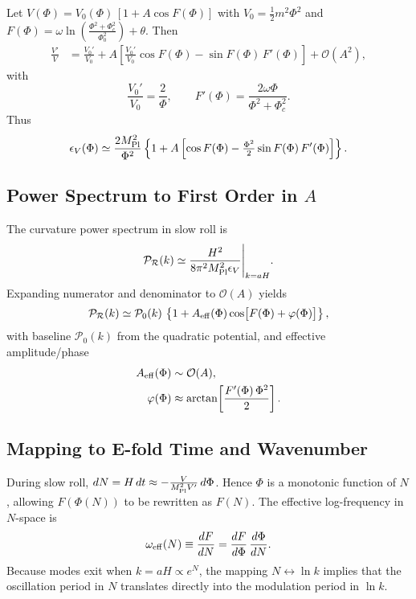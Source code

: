 \documentclass[reprint, amsmath, amssymb, aps, prd, nofootinbib]{revtex4-2}
\begin{document}
Let $V(\Phi) = V_0(\Phi)\,[1+A \cos F(\Phi)]$ with $V_0 = \tfrac{1}{2} m^2 \Phi^2$
and $F(\Phi)= \omega \ln(\tfrac{\Phi^2+\Phi_c^2}{\Phi_0^2})+\theta$.
Then
\begin{align}
\frac{V'}{V}
&= \frac{V_0'}{V_0}
+ A\left[\frac{V_0'}{V_0}\cos F(\Phi) - \sin F(\Phi)\,F'(\Phi)\right]
+ \mathcal{O}(A^2),
\end{align}
with
\begin{equation}
\frac{V_0'}{V_0} = \frac{2}{\Phi}, \qquad
F'(\Phi) = \frac{2\omega \Phi}{\Phi^2+\Phi_c^2}.
\end{equation}
Thus
\begin{equation}
\epsilon_V(\Phi) \simeq \frac{2 M_{\rm Pl}^2}{\Phi^2}
\left\{ 1 + A \left[ \cos F(\Phi) - \tfrac{\Phi^2}{2} \sin F(\Phi)\,F'(\Phi)\right] \right\}.
\end{equation}

\subsection{Power Spectrum to First Order in $A$}

The curvature power spectrum in slow roll is
\begin{equation}
\mathcal{P}_\mathcal{R}(k) \simeq \frac{H^2}{8\pi^2 M_{\rm Pl}^2 \epsilon_V}
\Bigg|_{k=aH}.
\label{eq:PR}
\end{equation}
Expanding numerator and denominator to $\mathcal{O}(A)$ yields
\begin{equation}
\mathcal{P}_\mathcal{R}(k) \simeq \mathcal{P}_0(k)\,
\left\{1 + A_{\rm eff}(\Phi)\cos\!\big[F(\Phi)+\varphi(\Phi)\big]\right\},
\end{equation}
with baseline $\mathcal{P}_0(k)$ from the quadratic potential, and effective
amplitude/phase
\begin{align}
A_{\rm eff}(\Phi) &\sim \mathcal{O}(A),\\
\varphi(\Phi) &\approx \arctan\!\left[\frac{F'(\Phi)\,\Phi^2}{2}\right].
\end{align}

\subsection{Mapping to E-fold Time and Wavenumber}

During slow roll, $dN = H\,dt \approx -\tfrac{V}{M_{\rm Pl}^2 V'}\,d\Phi$.
Hence $\Phi$ is a monotonic function of $N$, allowing
$F(\Phi(N))$ to be rewritten as $F(N)$.
The effective log-frequency in $N$-space is
\begin{equation}
\omega_{\rm eff}(N) \equiv \frac{dF}{dN}
= \frac{dF}{d\Phi}\,\frac{d\Phi}{dN}.
\end{equation}
Because modes exit when $k=aH \propto e^N$, the mapping
$N \leftrightarrow \ln k$ implies that the oscillation period in $N$
translates directly into the modulation period in $\ln k$.
\end{document}
